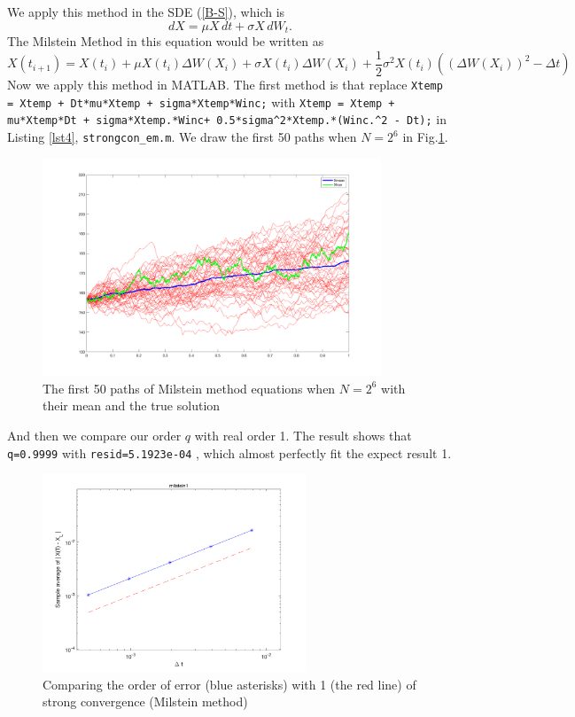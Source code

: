 \documentclass[12pt,a4paper]{article}
\theoremstyle{definition}
\begin{document}
We apply this method in the SDE (\ref{B-S}), which is $$
dX = \mu X\, dt+ \sigma X\, dW_t.
$$
The Milstein Method in this equation would be written as\begin{equation}
\label{milstein1}
    X(t_{i+1})= X(t_i) + \mu X(t_i) \Delta W(X_i) +\sigma X(t_i)\Delta W(X_i)+\frac{1}{2}\sigma^2 X(t_i) ((\Delta W(X_i))^2-\Delta t)
\end{equation}
Now we apply this method in MATLAB. The first method is that replace \lstinline{Xtemp = Xtemp + Dt*mu*Xtemp + sigma*Xtemp*Winc;} with \lstinline{Xtemp = Xtemp + mu*Xtemp*Dt + sigma*Xtemp.*Winc+ 0.5*sigma^2*Xtemp.*(Winc.^2 - Dt);} in Listing \ref{lst4}, \verb|strongcon_em.m|. We draw the first 50 paths when $N=2^6$ in Fig.\ref{fig8}.
\begin{figure}[htbp]
\centering
\includegraphics[width=0.9\textwidth]{fig/fig8.png}
\caption{\label{fig8}The first 50 paths of Milstein method equations when $N=2^6$ with their mean and the true solution }
\end{figure}
And then we compare our order $q$ with real order 1. The result shows that \verb|q=0.9999| with \verb|resid=5.1923e-04| , which almost perfectly fit the expect result 1.

\begin{figure}[htbp]
\centering
\includegraphics[width=0.7\textwidth]{fig/fig9.png}
\caption{\label{fig9} Comparing the order of error (blue asterisks) with 1 (the red line) of strong convergence (Milstein method)  }
\end{figure}
\end{document}
